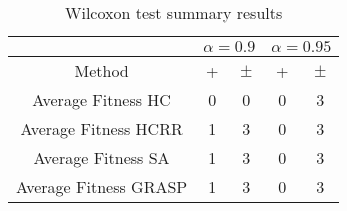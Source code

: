 \documentclass[a4paper,10pt]{article}
\begin{document}
\begin{table}[!htp]
\centering\scriptsize
\begin{tabular}{
|c|c|c|c|c|}
\hline
&\multicolumn{2}{c|}{$\alpha=0.9$} & \multicolumn{2}{c|}{$\alpha=0.95$}\\\hline
Method & + & $\pm$ & + & $\pm$ \\
\hline
Average Fitness HC & 0 & 0 & 0 & 3\\
\hline
Average Fitness HCRR & 1 & 3 & 0 & 3\\
\hline
Average Fitness SA & 1 & 3 & 0 & 3\\
\hline
Average Fitness GRASP & 1 & 3 & 0 & 3\\
\hline

\end{tabular}
\caption{Wilcoxon test summary results}

\end{table}

 \clearpage 
\end{document}
